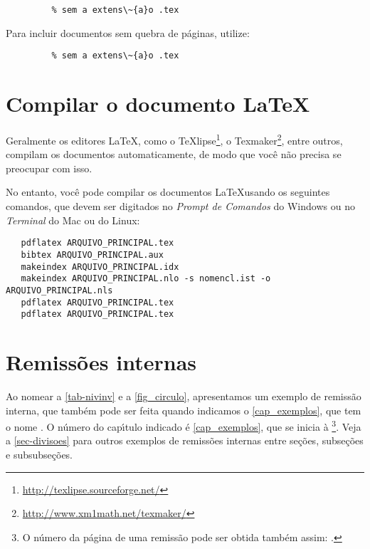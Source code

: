 \begin{verbatim}
         % sem a extens\~{a}o .tex
\end{verbatim}

Para incluir documentos sem quebra de p\'{a}ginas, utilize:

\begin{verbatim}
         % sem a extens\~{a}o .tex
\end{verbatim}

\section{Compilar o documento \LaTeX}

Geralmente os editores \LaTeX, como o
TeXlipse\footnote{\url{http://texlipse.sourceforge.net/}}, o
Texmaker\footnote{\url{http://www.xm1math.net/texmaker/}}, entre outros,
compilam os documentos automaticamente, de modo que voc\^{e} n\~{a}o precisa se
preocupar com isso.

No entanto, voc\^{e} pode compilar os documentos \LaTeX usando os seguintes
comandos, que devem ser digitados no \emph{Prompt de Comandos} do Windows ou no
\emph{Terminal} do Mac ou do Linux:

\begin{verbatim}
   pdflatex ARQUIVO_PRINCIPAL.tex
   bibtex ARQUIVO_PRINCIPAL.aux
   makeindex ARQUIVO_PRINCIPAL.idx
   makeindex ARQUIVO_PRINCIPAL.nlo -s nomencl.ist -o ARQUIVO_PRINCIPAL.nls
   pdflatex ARQUIVO_PRINCIPAL.tex
   pdflatex ARQUIVO_PRINCIPAL.tex
\end{verbatim}

\section{Remiss\~{o}es internas}

Ao nomear a \autoref{tab-nivinv} e a \autoref{fig_circulo}, apresentamos um
exemplo de remiss\~{a}o interna, que tamb\'{e}m pode ser feita quando indicamos o
\autoref{cap_exemplos}, que tem o nome \emph{}. O n\'{u}mero
do cap\'{\i}tulo indicado \'{e} \ref{cap_exemplos}, que se inicia \`{a}
\footnote{O n\'{u}mero da p\'{a}gina de uma remiss\~{a}o pode ser
obtida tamb\'{e}m assim:
\pageref{cap_exemplos}.}.
Veja a \autoref{sec-divisoes} para outros exemplos de remiss\~{o}es internas entre
se\c{c}\~{o}es, subse\c{c}\~{o}es e subsubse\c{c}\~{o}es.

